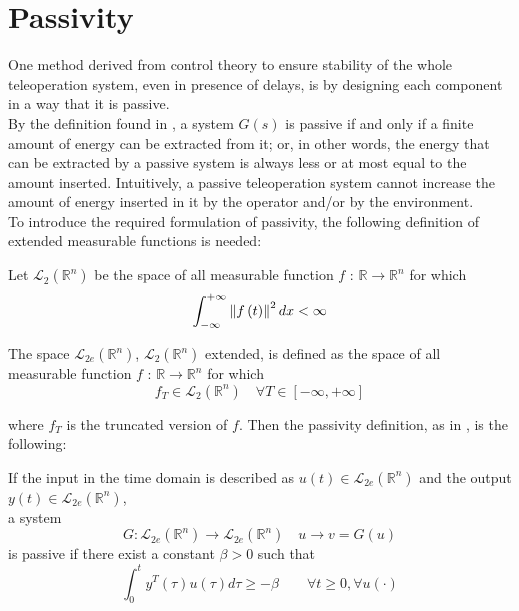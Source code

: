 \section{Passivity}
One method derived from control theory to ensure stability of the whole teleoperation system, even in presence of delays, is by designing each component in a way that it is passive.\\
By the definition found in \cite{Lozano200}, a system $G(s)$ is passive if and only if a finite amount of energy can be extracted from it; or, in other words, the energy that can be extracted by a passive system is always less or at most equal to the amount inserted. 
Intuitively, a passive teleoperation system cannot increase the amount of energy inserted in it by the operator and/or by the environment.\\
To introduce the required formulation of passivity, the following definition of extended measurable functions is needed:
\begin{definition}
	Let $\mathcal{L}_{2}(\mathbb{R}^{n})$ be the space of all measurable function $f$ : $\mathbb{R} \rightarrow \mathbb{R}^{n}$ for which
	\begin{equation}
	\int_{-\infty}^{+\infty} \left\lVert f\left( t\right) \right\rVert^{2} dx < \infty
	\end{equation}
\end{definition}
\begin{definition}
	The space $\mathcal{L}_{2e}(\mathbb{R}^{n})$, $\mathcal{L}_{2}(\mathbb{R}^{n})$ extended, is defined as the space of all measurable function $f$ : $\mathbb{R} \rightarrow \mathbb{R}^{n}$ for which
	\begin{equation}
		f_{T} \in \mathcal{L}_{2}(\mathbb{R}^{n}) \quad \forall T\in\left[ -\infty,+\infty \right] 
	\end{equation}
\end{definition}
where $f_{T}$ is the truncated version of $f$.
Then the passivity definition, as in \cite{Anderson1989}, is the following:
\begin{definition}
	If the input in the time domain is described as $u(t) \in \mathcal{L}_{2e}(\mathbb{R}^{n})$ and the output $y(t) \in \mathcal{L}_{2e}(\mathbb{R}^{n})$,\\
	a system
	\[G :  \mathcal{L}_{2e}(\mathbb{R}^{n}) \rightarrow \mathcal{L}_{2e}(\mathbb{R}^{n}) \quad u \rightarrow v = G(u)\]
	is passive if there exist a constant $\beta > 0$ such that
	\begin{equation}
		\int_{0}^{t}y^{T}(\tau)u(\tau) d\tau\geq-\beta \quad\quad\forall t \geq0, \forall u\left( \cdotp \right) 
	\end{equation}
\end{definition}
